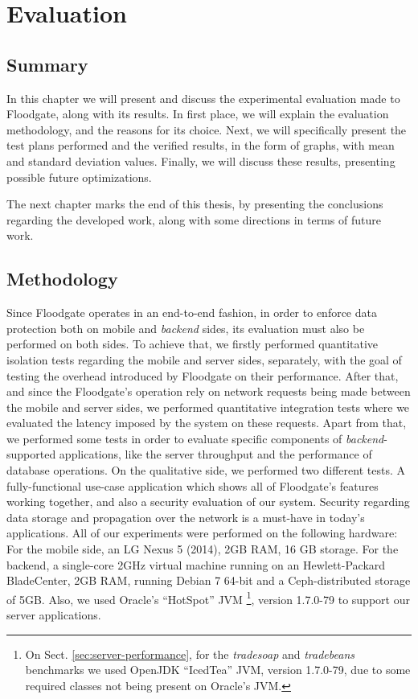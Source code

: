\chapter{Evaluation}
\label{sec:evaluation}

\section*{Summary}

In this chapter we will present and discuss the experimental evaluation made to Floodgate, along with its results. In first place, we will explain the evaluation methodology, and the reasons for its choice. Next, we will specifically present the test plans performed and the verified results, in the form of graphs, with mean and standard deviation values. Finally, we will discuss these results, presenting possible future optimizations.

The next chapter marks the end of this thesis, by presenting the conclusions regarding the developed work, along with some directions in terms of future work.

\section{Methodology}

Since Floodgate operates in an end-to-end fashion, in order to enforce data protection both on mobile and \textit{backend} sides, its evaluation must also be performed on both sides. To achieve that, we firstly performed quantitative isolation tests regarding the mobile and server sides, separately, with the goal of testing the overhead introduced by Floodgate on their performance. After that, and since the Floodgate's operation rely on network requests being made between the mobile and server sides, we performed quantitative integration tests where we evaluated the latency imposed by the system on these requests. Apart from that, we performed some tests in order to evaluate specific components of \textit{backend}-supported applications, like the server throughput and the performance of database operations. On the qualitative side, we performed two different tests. A fully-functional use-case application which shows all of Floodgate's features working together, and also a security evaluation of our system. Security regarding data storage and propagation over the network is a must-have in today's applications. All of our experiments were performed on the following hardware: For the mobile side, an LG Nexus 5 (2014), 2GB RAM, 16 GB storage. For the backend, a single-core 2GHz virtual machine running on an Hewlett-Packard BladeCenter, 2GB RAM, running Debian 7 64-bit and a Ceph-distributed storage of 5GB. Also, we used Oracle's ``HotSpot'' JVM \footnote{On Sect. \ref{sec:server-performance}, for the \textit{tradesoap} and \textit{tradebeans} benchmarks we used OpenJDK ``IcedTea'' JVM, version 1.7.0-79, due to some required classes not being present on Oracle's JVM.}, version 1.7.0-79 to support our server applications.

